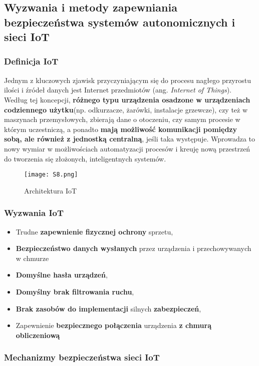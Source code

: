 \subsection{Wyzwania i metody zapewniania bezpieczeństwa systemów autonomicznych i sieci IoT}

\subsubsection{Definicja IoT}

Jednym z kluczowych zjawisk przyczyniającym się do procesu nagłego przyrostu ilości i źródeł danych jest Internet przedmiotów (ang. \textit{Internet of Things}). Według tej koncepcji, \textbf{różnego typu urządzenia osadzone w urządzeniach codziennego użytku}(np. odkurzacze, żarówki, instalacje grzewcze), czy też w maszynach przemysłowych, zbierają dane o otoczeniu, czy samym procesie w którym uczestniczą, a ponadto \textbf{mają możliwość komunikacji pomiędzy sobą, ale również z jednostką centralną}, jeśli taka występuje. Wprowadza to nowy wymiar w możliwościach automatyzacji procesów i kreuję nową przestrzeń do tworzenia się złożonych, inteligentnych systemów.

\begin{figure}[H]
	\centering
	\texttt{[image: S8.png]}
	\caption{Architektura IoT}
\end{figure}

\subsubsection{Wyzwania IoT}

\begin{itemize}
	\item Trudne \textbf{zapewnienie fizycznej ochrony} sprzetu,
	\item \textbf{Bezpieczeństwo danych wysłanych} przez urządzenia i przechowywanych w chmurze
	\item \textbf{Domyślne hasła urządzeń},
	\item \textbf{Domyślny brak filtrowania ruchu},
	\item \textbf{Brak zasobów do implementacji} silnych \textbf{zabezpieczeń},
	\item Zapewnienie \textbf{bezpiecznego połączenia} urządzenia \textbf{z chmurą obliczeniową}
\end{itemize}

\subsubsection{Mechanizmy bezpieczeństwa sieci IoT}

